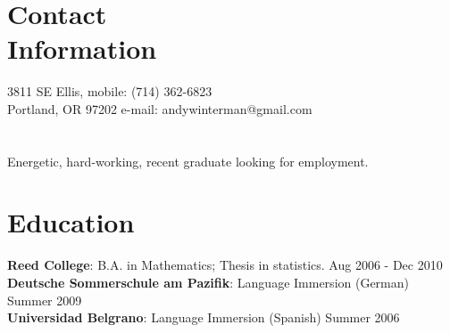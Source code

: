 \documentclass[margin,line]{resume}
\begin{document}
\begin{resume}

    \section{\mysidestyle Contact\\Information}


    3811 SE Ellis,                           \hfill  mobile: (714) 362-6823          \vspace{0mm}\\\vspace{0mm}%
    Portland, OR 97202                         \hfill     e-mail: andywinterman@gmail.com      \vspace{0mm}\\%
  \vspace{-4.5mm}%

 \section{} Energetic, hard-working, recent graduate looking for employment.%
    \section{\mysidestyle Education}

\textbf{Reed College}: B.A. in Mathematics; Thesis in statistics.
 \vspace{1mm} \hfill Aug 2006 - Dec 2010 \vspace{1mm}\\
\textbf{Deutsche Sommerschule am Pazifik}:  Language Immersion (German) \vspace{1mm} \hfill Summer 2009
\vspace{1mm} \\
\textbf{Universidad Belgrano}: Language Immersion (Spanish) \vspace{1mm} \hfill Summer 2006 \vspace{1mm}

    

\end{resume}
\end{document}
